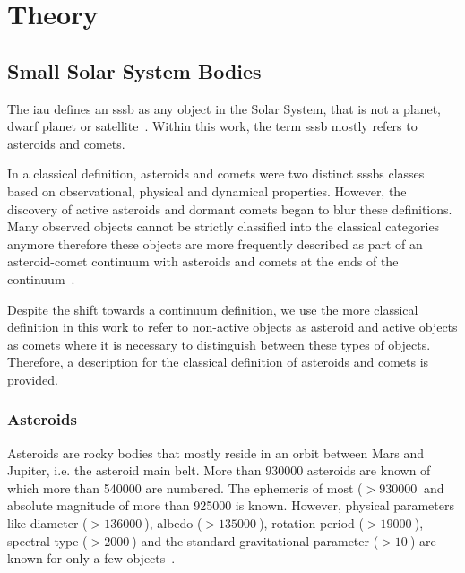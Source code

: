 \section{Theory} \label{sec:theory}
%
%
%
%

\subsection{Small Solar System Bodies}
The \gls{iau} defines an \gls{sssb} as any object in the Solar System, that is not a planet, dwarf planet or satellite~\cite{iau_sssb}. Within this work, the term \gls{sssb} mostly refers to asteroids and comets.

In a classical definition, asteroids and comets were two distinct \glspl{sssb} classes based on observational, physical and dynamical properties. However, the discovery of active asteroids and dormant comets began to blur these definitions. Many observed objects cannot be strictly classified into the classical categories anymore therefore these objects are more frequently described as part of an asteroid-comet continuum with asteroids and comets at the ends of the continuum~\cite{Hsieh2017Asteroid-cometSystem}.

Despite the shift towards a continuum definition, we use the more classical definition in this work to refer to non-active objects as asteroid and active objects as comets where it is necessary to distinguish between these types of objects. Therefore, a description for the classical definition of asteroids and comets is provided.

\subsubsection{Asteroids}
Asteroids are rocky bodies that mostly reside in an orbit between Mars and Jupiter, i.e. the asteroid main belt. More than \SI{930000}{} asteroids are known of which more than \SI{540000}{} are numbered. The ephemeris of most ($> \SI{930000}{}$ and absolute magnitude of more than \SI{925000}{} is known. However, physical parameters like diameter ($> \SI{136000}{}$), albedo ($> \SI{135000}{}$), rotation period ($> \SI{19000}{}$), spectral type ($> \SI{2000}{}$) and the standard gravitational parameter ($> \SI{10}{}$) are known for only a few objects~\cite{JPLEngine}.

